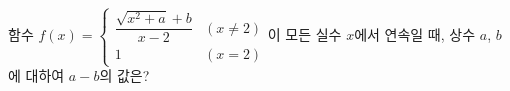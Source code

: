 함수 $f(x)=\begin{cases} \dfrac{\sqrt{x^2+a}+b}{x-2} & (x\ne 2) \\[1ex] 1 & (x=2) \end{cases}$이 모든 실수 $x$에서 연속일 때, 상수 $a$, $b$에 대하여 $a-b$의 값은?
